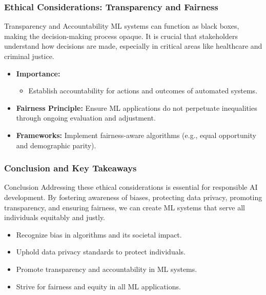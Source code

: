 \documentclass{beamer}
\begin{document}
\begin{frame}[fragile]
    \frametitle{Ethical Considerations: Transparency and Fairness}
    \begin{block}{Transparency and Accountability}
        ML systems can function as black boxes, making the decision-making process opaque. It is crucial that stakeholders understand how decisions are made, especially in critical areas like healthcare and criminal justice.
    \end{block}
    
    \begin{itemize}
        \item \textbf{Importance:}
        \begin{itemize}
            \item Establish accountability for actions and outcomes of automated systems.
        \end{itemize}
        
        \item \textbf{Fairness Principle:} Ensure ML applications do not perpetuate inequalities through ongoing evaluation and adjustment.
        
        \item \textbf{Frameworks:} Implement fairness-aware algorithms (e.g., equal opportunity and demographic parity).
    \end{itemize}
\end{frame}

\begin{frame}[fragile]
    \frametitle{Conclusion and Key Takeaways}
    \begin{block}{Conclusion}
        Addressing these ethical considerations is essential for responsible AI development. By fostering awareness of biases, protecting data privacy, promoting transparency, and ensuring fairness, we can create ML systems that serve all individuals equitably and justly.
    \end{block}
    
    \begin{itemize}
        \item Recognize bias in algorithms and its societal impact.
        \item Uphold data privacy standards to protect individuals.
        \item Promote transparency and accountability in ML systems.
        \item Strive for fairness and equity in all ML applications.
    \end{itemize}
\end{frame}
\end{document}
